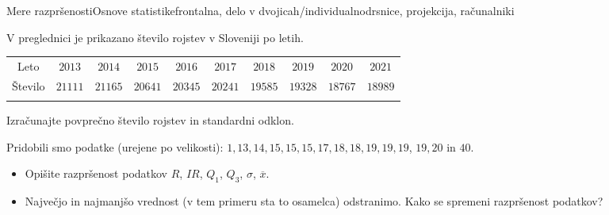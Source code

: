 \begin{priprava}{4}{}{Mere razpršenosti}{Osnove statistike}{frontalna, delo v dvojicah/individualno}{drsnice, projekcija, računalniki}
\begin{naloga}
V preglednici je prikazano število rojstev v Sloveniji po letih. 

 \begin{table}[H]
     \centering
     \begin{tabular}{||c|c|c|c|c|c|c|c|c|c||} 
     \hhline{|t:==========:t|}
     \rowcolor[rgb]{0.843,0.718,0.718} 
     Leto   & $2013$ & $2014$ & $2015$ & $2016$ & $2017$ & $2018$ & $2019$ & $2020$ & $2021$    \\ 
     \hhline{|:==========:|}
     Število  & $21111$ & $21165$ & $20641$ & $20345$ & $20241$ & $19585$ & $19328$ & $18767$ & $18989$ \\ 
     \hhline{|b:==========:b|}
     \end{tabular}
 \end{table}

 Izračunajte povprečno število rojstev in standardni odklon.

\end{naloga}


 \begin{naloga}

    Pridobili smo podatke (urejene po velikosti): $1, 13, 14, 15, 15, 15, 17, 18, 18, 19, 19, 19$, $19, 20$ in $40$.
    \begin{itemize}
        \item Opišite razpršenost podatkov $R$, $IR$, $Q_1$, $Q_3$, $\sigma$, $\overline{x}$.
        \item Največjo in najmanjšo vrednost (v tem primeru sta to osamelca) odstranimo. Kako se spremeni razpršenost podatkov? 
    \end{itemize}
    
\end{naloga}





\end{priprava}